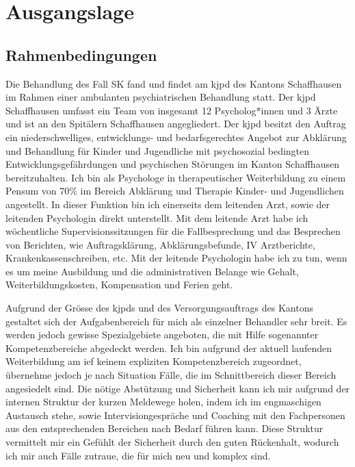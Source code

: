 \section{Ausgangslage} \label{Ausgangslage}
\subsection{Rahmenbedingungen}
Die Behandlung des Fall SK fand und findet am \ac{kjpd} des Kantons Schaffhausen im Rahmen einer ambulanten psychiatrischen Behandlung statt. Der \ac{kjpd} Schaffhausen umfasst ein Team von insgesamt 12 Psycholog*innen und 3 Ärzte und ist an den Spitälern Schaffhausen angegliedert. Der \ac{kjpd} besitzt den Auftrag ein niederschwelliges, entwicklungs- und bedarfsgerechtes Angebot zur Abklärung und Behandlung für Kinder und Jugendliche mit psychosozial bedingten Entwicklungsgefährdungen und psychischen Störungen im Kanton Schaffhausen bereitzuhalten. Ich bin als Psychologe in therapeutischer Weiterbildung zu einem Pensum von 70\% im Bereich Abklärung und Therapie Kinder- und Jugendlichen angestellt. In dieser Funktion bin ich einerseits dem leitenden Arzt, sowie der leitenden Psychologin direkt unterstellt. Mit dem leitende Arzt habe ich wöchentliche Supervisionssitzungen für die Fallbesprechung und das Besprechen von Berichten, wie Auftragsklärung,  Abklärungsbefunde, IV Arztberichte, Krankenkassenschreiben, etc. Mit der leitende Psychologin habe ich zu tun, wenn es um meine Ausbildung und die administrativen Belange wie Gehalt, Weiterbildungskosten, Kompensation und Ferien geht.  

Aufgrund der Grösse des \ac{kjpd}s und des Versorgungsauftrags des Kantons gestaltet sich der Aufgabenbereich für mich als einzelner Behandler sehr breit. Es werden jedoch gewisse Spezialgebiete angeboten, die mit Hilfe sogenannter Kompetenzbereiche abgedeckt werden. Ich bin aufgrund der aktuell laufenden Weiterbildung am \ac{ief} keinem expliziten Kompetenzbereich zugeordnet, übernehme jedoch je nach Situation Fälle, die im Schnittbereich dieser Bereich angesiedelt sind. Die nötige Abstützung und Sicherheit kann ich mir aufgrund der internen Struktur der kurzen Meldewege holen, indem ich im engmaschigen Austausch stehe, sowie Intervisiongespräche und Coaching mit den Fachpersonen aus den entsprechenden Bereichen nach Bedarf führen kann. Diese Struktur vermittelt mir ein Gefühlt der Sicherheit durch den guten Rückenhalt, wodurch ich mir auch Fälle zutraue, die für mich neu und komplex sind.

